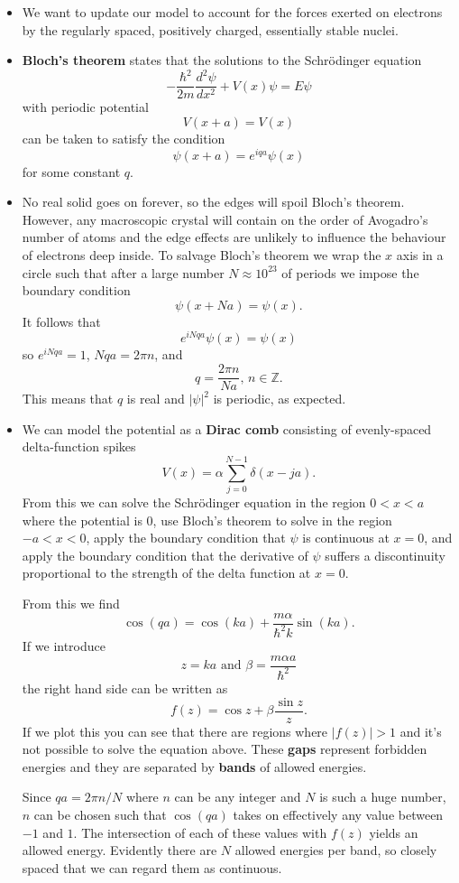\documentclass{article}
\begin{document}
\begin{itemize}
  \item We want to update our model to account for the forces exerted on electrons by the regularly spaced, positively charged, essentially stable nuclei.

  \item \textbf{Bloch's theorem} states that the solutions to the Schrödinger equation \[-\frac{\hbar^2}{2 m} \frac{d^2 \psi}{d x^2} + V(x) \psi = E \psi\] with periodic potential \[V(x + a) = V(x)\] can be taken to satisfy the condition \[\psi(x + a) = e^{i q a} \psi(x)\] for some constant $q$.

  \item No real solid goes on forever, so the edges will spoil Bloch's theorem. However, any macroscopic crystal will contain on the order of Avogadro's number of atoms and the edge effects are unlikely to influence the behaviour of electrons deep inside. To salvage Bloch's theorem we wrap the $x$ axis in a circle such that after a large number $N \approx 10^{23}$ of periods we impose the boundary condition \[\psi(x + N a) = \psi(x).\] It follows that \[e^{i N q a} \psi(x) = \psi(x)\] so $e^{i N q a} = 1$, $N q a = 2 \pi n$, and \[q = \frac{2 \pi n}{N a}, \,n \in \mathbb{Z}.\] This means that $q$ is real and $|\psi|^2$ is periodic, as expected.

  \item We can model the potential as a \textbf{Dirac comb} consisting of evenly-spaced delta-function spikes \[V(x) = \alpha \sum_{j = 0}^{N - 1} \delta(x - j a).\] From this we can solve the Schrödinger equation in the region $0 < x < a$ where the potential is $0$, use Bloch's theorem to solve in the region $-a < x < 0$, apply the boundary condition that $\psi$ is continuous at $x = 0$, and apply the boundary condition that the derivative of $\psi$ suffers a discontinuity proportional to the strength of the delta function at $x = 0$.

        From this we find \[\cos(q a) = \cos(k a) + \frac{m \alpha}{\hbar^2 k} \sin(k a).\] If we introduce \[z = k a \text{ and } \beta = \frac{m \alpha a}{\hbar^2}\] the right hand side can be written as \[f(z) = \cos z + \beta \frac{\sin z}{z}.\] If we plot this you can see that there are regions where $|f(z)| > 1$ and it's not possible to solve the equation above. These \textbf{gaps} represent forbidden energies and they are separated by \textbf{bands} of allowed energies.

        Since $q a = 2 \pi n / N$ where $n$ can be any integer and $N$ is such a huge number, $n$ can be chosen such that $\cos(q a)$ takes on effectively any value between $-1$ and $1$. The intersection of each of these values with $f(z)$ yields an allowed energy. Evidently there are $N$ allowed energies per band, so closely spaced that we can regard them as continuous.


\end{itemize}
\end{document}
